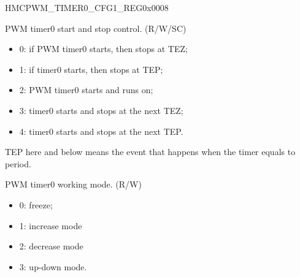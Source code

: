 \begin{register}{H}{MCPWM\_TIMER0\_CFG1\_REG}{0x{}0008}\label{regdesc:MCPWMTIMER0CFG1REG}
%
%
%
\regnewline%
\begin{regdesc}\begin{reglist}
\label{fielddesc:MCPWMTIMER0START}\item [MCPWM\_TIMER0\_START] PWM timer0 start and stop control. (R/W/SC)
\begin{itemize}
    \item 0: if PWM timer0 starts, then stops at TEZ;
    \item 1: if timer0 starts, then stops at TEP;
    \item 2: PWM timer0 starts and runs on;
    \item 3: timer0 starts and stops at the next TEZ;
    \item 4: timer0 starts and stops at the next TEP.
\end{itemize}
TEP here and below means the event that happens when the timer equals to period.
\label{fielddesc:MCPWMTIMER0MOD}\item [MCPWM\_TIMER0\_MOD] PWM timer0 working mode. (R/W)
\begin{itemize}
    \item 0: freeze;
    \item 1: increase mode
    \item 2: decrease mode
    \item 3: up-down mode.
\end{itemize}
\end{reglist}\end{regdesc}
\end{register}


